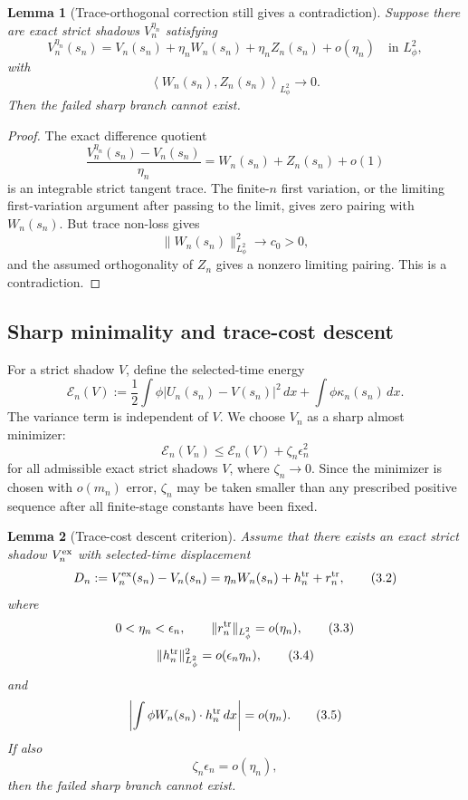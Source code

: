 \documentclass[11pt]{article}
\numberwithin{equation}{section}
\theoremstyle{plain}
\newtheorem{lemma}{Lemma}[section]
\theoremstyle{definition}
\theoremstyle{remark}
\newcommand{\dx}{\,dx}
\newcommand{\ip}[2]{\left\langle #1,#2\right\rangle}
\begin{document}
\begin{lemma}[Trace-orthogonal correction still gives a contradiction]
\label{pV:lem:trace-orthogonal-correction-contradiction}
Suppose there are exact strict shadows \(V_n^{\eta_n}\) satisfying
\[
        V_n^{\eta_n}(s_n)
        =V_n(s_n)+\eta_n W_n(s_n)+\eta_n Z_n(s_n)+o(\eta_n)
        \quad\text{in }L^2_\phi,
\]
with
\[
        \ip{W_n(s_n)}{Z_n(s_n)}_{L^2_\phi}\to0.
\]
Then the failed sharp branch cannot exist.
\end{lemma}

\begin{proof}
The exact difference quotient
\[
        \frac{V_n^{\eta_n}(s_n)-V_n(s_n)}{\eta_n}
        =W_n(s_n)+Z_n(s_n)+o(1)
\]
is an integrable strict tangent trace.  The finite-\(n\) first variation, or the limiting
first-variation argument after passing to the limit, gives zero pairing with \(W_n(s_n)\).  But
trace non-loss gives
\[
        \|W_n(s_n)\|_{L^2_\phi}^2\to c_0>0,
\]
and the assumed orthogonality of \(Z_n\) gives a nonzero limiting pairing.  This is a
contradiction.
\end{proof}


\subsection{Sharp minimality and trace-cost descent}

For a strict shadow \(V\), define the selected-time energy
\[
        \mathcal E_n(V)
        :=
        \frac12\int \phi |U_n(s_n)-V(s_n)|^2\dx
        +
        \int\phi\kappa_n(s_n)\dx .
\]
The variance term is independent of \(V\).  We choose \(V_n\) as a sharp almost minimizer:
\[
        \mathcal E_n(V_n)
        \le
        \mathcal E_n(V)+\zeta_n\epsilon_n^2
        \tag{3.1}
\]
for all admissible exact strict shadows \(V\), where \(\zeta_n\to0\).  Since the minimizer is chosen with \(o(m_n)\) error, \(\zeta_n\) may be taken smaller than any prescribed positive sequence after all finite-stage constants have been fixed.

\begin{lemma}[Trace-cost descent criterion]
\label{pV:lem:trace-cost-descent-criterion}
Assume that there exists an exact strict shadow \(V_n^{\rm ex}\) with selected-time displacement
\[
        D_n:=V_n^{\rm ex}(s_n)-V_n(s_n)
        =
        \eta_n W_n(s_n)+h_n^{\rm tr}+r_n^{\rm tr},
        \tag{3.2}
\]
where
\[
        0<\eta_n<\epsilon_n,
        \qquad
        \|r_n^{\rm tr}\|_{L^2_\phi}=o(\eta_n),
        \tag{3.3}
\]
\[
        \|h_n^{\rm tr}\|_{L^2_\phi}^2=o(\epsilon_n\eta_n),
        \tag{3.4}
\]
and
\[
        \left|
        \int\phi W_n(s_n)\cdot h_n^{\rm tr}\dx
        \right|=o(\eta_n).
        \tag{3.5}
\]
If also
\[
        \zeta_n\epsilon_n=o(\eta_n),
        \tag{3.6}
\]
then the failed sharp branch cannot exist.
\end{lemma}
\end{document}
